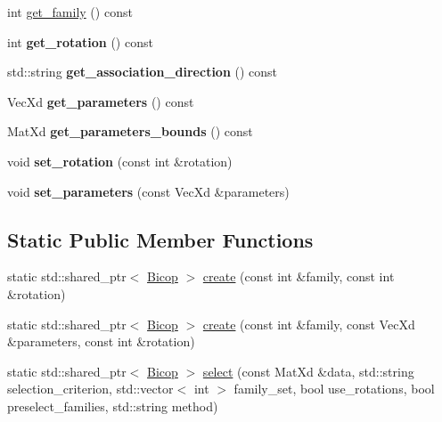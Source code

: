 \textbf{ }\par
\begin{DoxyCompactItemize}
\item 
int \hyperlink{class_bicop_aae626e9aa8116c684eeff372bdd98904}{get\+\_\+family} () const
\item 
\mbox{\label{class_bicop_a135ed12c7499db044add5b9d2463bb22}} 
int {\bfseries get\+\_\+rotation} () const
\item 
\mbox{\label{class_bicop_adde8fc6d920041c2ab93a5ba0cc874cb}} 
std\+::string {\bfseries get\+\_\+association\+\_\+direction} () const
\item 
\mbox{\label{class_bicop_adfcce2c1ea680a801c9d9d50921102b5}} 
Vec\+Xd {\bfseries get\+\_\+parameters} () const
\item 
\mbox{\label{class_bicop_a5f87a72771fcec6a33d43d672626c2d8}} 
Mat\+Xd {\bfseries get\+\_\+parameters\+\_\+bounds} () const
\item 
\mbox{\label{class_bicop_af5cded47298fa11fc0f997d7a873cf92}} 
void {\bfseries set\+\_\+rotation} (const int \&rotation)
\item 
\mbox{\label{class_bicop_a86d6d832e19d4e947fad68590e6f1b40}} 
void {\bfseries set\+\_\+parameters} (const Vec\+Xd \&parameters)
\end{DoxyCompactItemize}

\subsection*{Static Public Member Functions}
\begin{DoxyCompactItemize}
\item 
static std\+::shared\+\_\+ptr$<$ \hyperlink{class_bicop}{Bicop} $>$ \hyperlink{class_bicop_acb60163725518f4ccfd7694272014686}{create} (const int \&family, const int \&rotation)
\item 
static std\+::shared\+\_\+ptr$<$ \hyperlink{class_bicop}{Bicop} $>$ \hyperlink{class_bicop_a4bfa38e69a96cc8a7c689e1161942e46}{create} (const int \&family, const Vec\+Xd \&parameters, const int \&rotation)
\item 
static std\+::shared\+\_\+ptr$<$ \hyperlink{class_bicop}{Bicop} $>$ \hyperlink{class_bicop_a6b1c154595bb17cd73f81cb4f563a776}{select} (const Mat\+Xd \&data, std\+::string selection\+\_\+criterion, std\+::vector$<$ int $>$ family\+\_\+set, bool use\+\_\+rotations, bool preselect\+\_\+families, std\+::string method)
\end{DoxyCompactItemize}
